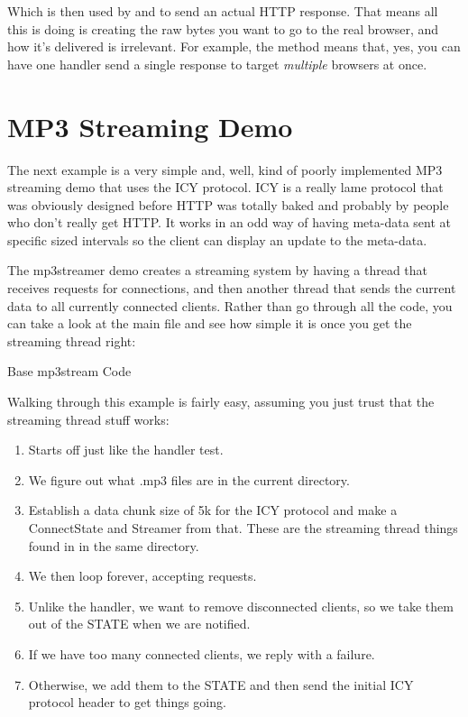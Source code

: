 Which is then used by  and
 to send an actual HTTP response.  That
means all this is doing is creating the raw bytes you want to go
to the real browser, and how it's delivered is irrelevant.  For example,
the  method means that, yes, you can have one
handler send a single response to target \emph{multiple} browsers
at once.


\section{MP3 Streaming Demo}

The next example is a very simple and, well, kind of poorly implemented
MP3 streaming demo that uses the ICY protocol.  ICY is a really lame
protocol that was obviously designed before HTTP was totally baked
and probably by people who don't really get HTTP.  It works in an odd
way of having meta-data sent at specific sized intervals so the
client can display an update to the meta-data.

The mp3streamer demo creates a streaming system by
having a thread that receives requests for connections, and then
another thread that sends the current data to all currently connected
clients.  Rather than go through all the code, you can take a look
at the main file and see how simple it is once you get the
streaming thread right:

\begin{code}{Base mp3stream Code}
  
\end{code}

Walking through this example is fairly easy, assuming you just trust
that the streaming thread stuff works:

\begin{enumerate}
\item Starts off just like the handler test.
\item We figure out what .mp3 files are in the current directory.
\item Establish a data chunk size of 5k for the ICY protocol and
    make a ConnectState and Streamer from that.  These are the
    streaming thread things found in  in the same
    directory.
\item We then loop forever, accepting requests.
\item Unlike the handler, we want to remove disconnected clients,
    so we take them out of the STATE when we are notified.
\item If we have too many connected clients, we reply with a failure.
\item Otherwise, we add them to the STATE and then send the initial
    ICY protocol header to get things going.
\end{enumerate}



